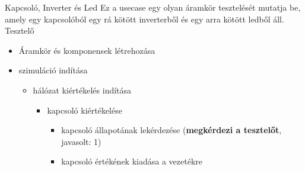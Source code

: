 \usecase
{Kapcsoló, Inverter és Led}
{Ez a usecase egy olyan áramkör tesztelését mutatja be, amely egy kapcsolóból egy rá kötött inverterből és egy arra kötött ledből áll.}
{Tesztelő}
{\vspace{-15pt}
\begin{itemize}
\setlength{\itemsep}{0cm}%
\setlength{\parskip}{0cm}%
\setlength{\itemindent}{-10pt}%
\item Áramkör és komponensek létrehozása
\item szimuláció indítása
\begin{itemize}
\setlength{\itemsep}{0cm}%
\setlength{\parskip}{0cm}%
\setlength{\itemindent}{-25pt}%
\item hálózat kiértékelés indítása
\begin{itemize}
\setlength{\itemsep}{0cm}%
\setlength{\parskip}{0cm}%
\setlength{\itemindent}{-25pt}%
	\item kapcsoló kiértékelése
	\begin{itemize}
	\setlength{\itemsep}{0cm}%
	\setlength{\parskip}{0cm}%
	\setlength{\itemindent}{-35pt}%
		\item kapcsoló állapotának lekérdezése (\textbf{megkérdezi a tesztelőt}, javasolt: 1)
		\item kapcsoló értékének kiadása a vezetékre
	\end{itemize}

\end{itemize}
\end{itemize}
\end{itemize}}
